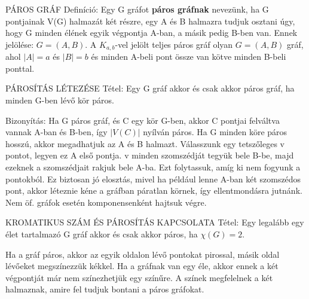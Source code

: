 \documentclass[]{article}
\begin{document}
\begin{shaded}
PÁROS GRÁF Definíció: Egy G gráfot \textbf{páros gráfnak} nevezünk, ha G pontjainak V(G) halmazát két részre, egy A és B halmazra tudjuk osztani úgy, hogy G minden élének egyik végpontja A-ban, a másik pedig B-ben van. Ennek jelölése: $G = (A,B)$. A $K_{a,b}$-vel jelölt teljes páros gráf olyan $G=(A,B)$ gráf, ahol $|A| = a$ és $|B| = b$ és minden A-beli pont össze van kötve minden B-beli ponttal.
\end{shaded}
\begin{framed}
PÁROSÍTÁS LÉTEZÉSE Tétel: Egy G gráf akkor és csak akkor páros gráf, ha minden G-ben lévő kör páros.
\end{framed}
\begin{leftbar}
Bizonyítás: Ha G páros gráf, és C egy kör G-ben, akkor C pontjai felváltva vannak A-ban és B-ben, így $|V(C)|$ nyílván páros. Ha G minden köre páros hosszú, akkor megadhatjuk az A és B halmazt. Válasszunk egy tetszőleges v pontot, legyen ez A első pontja.  v minden szomszédját tegyük bele B-be, majd ezeknek a szomszédjait rakjuk bele A-ba. Ezt folytassuk, amíg ki nem fogyunk a pontokból. Ez biztosan jó elosztás, mivel ha például lenne A-ban két szomszédos pont, akkor léteznie kéne a gráfban páratlan körnek, így ellentmondásra jutnánk. Nem öf. gráfok esetén komponensenként hajtsuk végre.
\end{leftbar}
\begin{framed}
KROMATIKUS SZÁM ÉS PÁROSÍTÁS KAPCSOLATA Tétel: Egy legalább egy élet tartalmazó G gráf akkor és csak akkor páros, ha $\chi(G) = 2$.
\end{framed}
\begin{leftbar}
Ha a gráf páros, akkor az egyik oldalon lévő pontokat pirossal, másik oldal lévőeket megszínezzük kékkel. Ha a gráfnak van egy éle, akkor ennek a két végpontját már nem színezhetjük egy színűre. A színek megfelelnek a két halmaznak, amire fel tudjuk bontani a páros gráfokat.
\end{leftbar}
\end{document}
